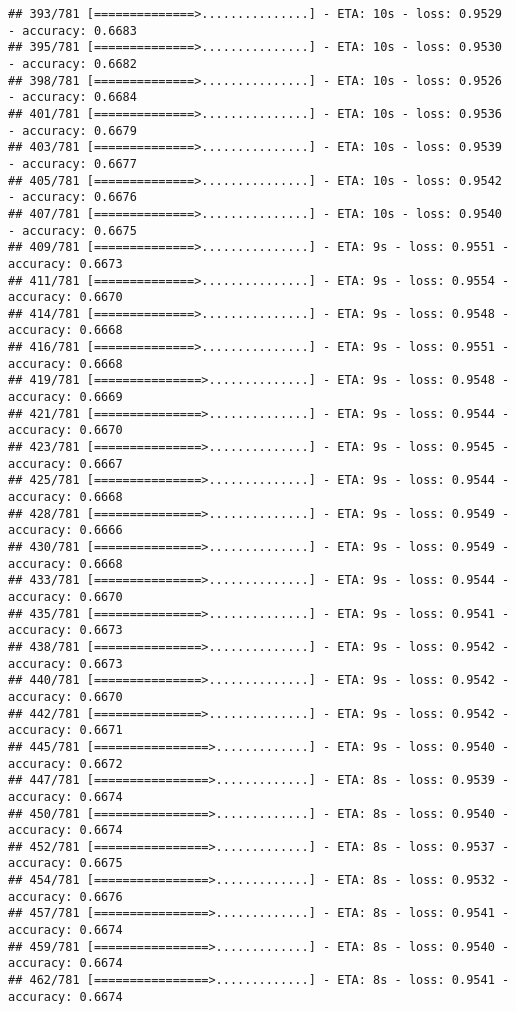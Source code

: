 \documentclass[
]{article}
\begin{document}
\begin{verbatim}
## 393/781 [==============>...............] - ETA: 10s - loss: 0.9529 - accuracy: 0.6683
## 395/781 [==============>...............] - ETA: 10s - loss: 0.9530 - accuracy: 0.6682
## 398/781 [==============>...............] - ETA: 10s - loss: 0.9526 - accuracy: 0.6684
## 401/781 [==============>...............] - ETA: 10s - loss: 0.9536 - accuracy: 0.6679
## 403/781 [==============>...............] - ETA: 10s - loss: 0.9539 - accuracy: 0.6677
## 405/781 [==============>...............] - ETA: 10s - loss: 0.9542 - accuracy: 0.6676
## 407/781 [==============>...............] - ETA: 10s - loss: 0.9540 - accuracy: 0.6675
## 409/781 [==============>...............] - ETA: 9s - loss: 0.9551 - accuracy: 0.6673 
## 411/781 [==============>...............] - ETA: 9s - loss: 0.9554 - accuracy: 0.6670
## 414/781 [==============>...............] - ETA: 9s - loss: 0.9548 - accuracy: 0.6668
## 416/781 [==============>...............] - ETA: 9s - loss: 0.9551 - accuracy: 0.6668
## 419/781 [===============>..............] - ETA: 9s - loss: 0.9548 - accuracy: 0.6669
## 421/781 [===============>..............] - ETA: 9s - loss: 0.9544 - accuracy: 0.6670
## 423/781 [===============>..............] - ETA: 9s - loss: 0.9545 - accuracy: 0.6667
## 425/781 [===============>..............] - ETA: 9s - loss: 0.9544 - accuracy: 0.6668
## 428/781 [===============>..............] - ETA: 9s - loss: 0.9549 - accuracy: 0.6666
## 430/781 [===============>..............] - ETA: 9s - loss: 0.9549 - accuracy: 0.6668
## 433/781 [===============>..............] - ETA: 9s - loss: 0.9544 - accuracy: 0.6670
## 435/781 [===============>..............] - ETA: 9s - loss: 0.9541 - accuracy: 0.6673
## 438/781 [===============>..............] - ETA: 9s - loss: 0.9542 - accuracy: 0.6673
## 440/781 [===============>..............] - ETA: 9s - loss: 0.9542 - accuracy: 0.6670
## 442/781 [===============>..............] - ETA: 9s - loss: 0.9542 - accuracy: 0.6671
## 445/781 [================>.............] - ETA: 9s - loss: 0.9540 - accuracy: 0.6672
## 447/781 [================>.............] - ETA: 8s - loss: 0.9539 - accuracy: 0.6674
## 450/781 [================>.............] - ETA: 8s - loss: 0.9540 - accuracy: 0.6674
## 452/781 [================>.............] - ETA: 8s - loss: 0.9537 - accuracy: 0.6675
## 454/781 [================>.............] - ETA: 8s - loss: 0.9532 - accuracy: 0.6676
## 457/781 [================>.............] - ETA: 8s - loss: 0.9541 - accuracy: 0.6674
## 459/781 [================>.............] - ETA: 8s - loss: 0.9540 - accuracy: 0.6674
## 462/781 [================>.............] - ETA: 8s - loss: 0.9541 - accuracy: 0.6674

\end{verbatim}
\end{document}
